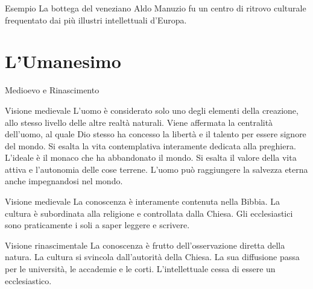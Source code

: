 \documentclass[12pt]{article}
\begin{document}
\begin{ex}{Esempio}
La bottega del veneziano Aldo Manuzio fu un centro di ritrovo culturale frequentato dai più illustri intellettuali d'Europa.
\end{ex}


\section{L'Umanesimo}


Medioevo e Rinascimento


\begin{defn}{Visione medievale}
L'uomo è considerato solo uno degli elementi della creazione, allo stesso livello delle altre realtà naturali. Viene affermata la centralità dell'uomo, al quale Dio stesso ha concesso la libertà e il talento per essere signore del mondo. Si esalta la vita contemplativa interamente dedicata alla preghiera. L'ideale è il monaco che ha abbandonato il mondo. Si esalta il valore della vita attiva e l'autonomia delle cose terrene. L'uomo può raggiungere la salvezza eterna anche impegnandosi nel mondo.
\end{defn}


\begin{defn}{Visione medievale}
La conoscenza è interamente contenuta nella Bibbia. La cultura è subordinata alla religione e controllata dalla Chiesa. Gli ecclesiastici sono praticamente i soli a saper leggere e scrivere.
\end{defn}


\begin{defn}{Visione rinascimentale}
La conoscenza è frutto dell'osservazione diretta della natura. La cultura si svincola dall'autorità della Chiesa. La sua diffusione passa per le università, le accademie e le corti. L'intellettuale cessa di essere un ecclesiastico.
\end{defn}
\end{document}
